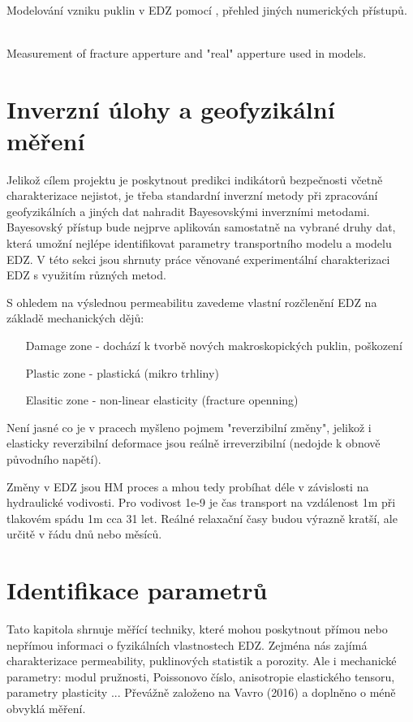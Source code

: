 \documentclass{article}
\begin{document}
{\bf \cite{Lisjak2014}}\\
Modelování vzniku puklin v EDZ pomocí ,
přehled jiných numerických přístupů. 

{\bf  \cite{Barton1985}}\\
Measurement of fracture apperture and "real" apperture used in models.



\section{Inverzní úlohy a geofyzikální měření}
Jelikož cílem projektu je poskytnout predikci indikátorů bezpečnosti 
včetně charakterizace nejistot, je třeba standardní inverzní metody při zpracování geofyzikálních a jiných dat nahradit Bayesovskými inverzními metodami. Bayesovský přístup bude nejprve aplikován samostatně na vybrané druhy dat, která umožní nejlépe identifikovat parametry transportního modelu a modelu EDZ. V této sekci jsou shrnuty práce věnované experimentální charakterizaci EDZ s využitím různých metod.

S ohledem na výslednou permeabilitu zavedeme vlastní rozčlenění EDZ na základě mechanických dějů:
\begin{itemize}
    \item [Damage zone] - dochází k tvorbě nových makroskopických puklin, poškození
    \item [Plastic zone] - plastická (mikro trhliny)
    \item [Elasitic zone] - non-linear elasticity (fracture openning)
\end{itemize}
Není jasné co je v pracech myšleno pojmem "reverzibilní změny", jelikož i elasticky reverzibilní deformace jsou reálně irreverzibilní (nedojde k obnově původního napětí).



Změny v EDZ jsou HM proces a mhou tedy probíhat déle v závislosti na hydraulické vodivosti. Pro vodivost 1e-9 je čas transport na vzdálenost 1m při tlakovém spádu 1m cca 31 let. Reálné relaxační časy budou výrazně kratší, ale určitě v řádu dnů nebo měsíců. 

\section{Identifikace parametrů}
\label{sec:parameters}

Tato kapitola shrnuje měřící techniky, které mohou poskytnout přímou nebo nepřímou informaci 
o fyzikálních vlastnostech EDZ. Zejména nás zajímá charakterizace permeability, puklinových statistik a porozity. Ale i mechanické parametry: modul pružnosti, Poissonovo číslo, anisotropie elastického tensoru,  parametry plasticity ...
Převážně založeno na Vavro (2016) \cite{SURAO_50/2016} a doplněno o méně obvyklá měření.
\end{document}

